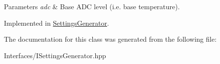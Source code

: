 \begin{DoxyParams}{Parameters}
{\em adc} & Base A\+DC level (i.\+e. base temperature). \\
\hline
\end{DoxyParams}


Implemented in \hyperlink{class_settings_generator_a806478b651a98ce128e97c2da385c302}{Settings\+Generator}.



The documentation for this class was generated from the following file\+:\begin{DoxyCompactItemize}
\item 
Interfaces/I\+Settings\+Generator.\+hpp\end{DoxyCompactItemize}
